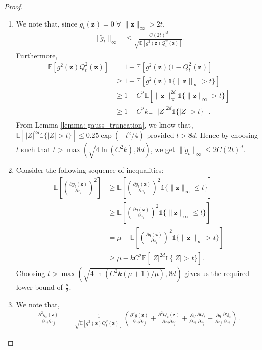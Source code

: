 \documentclass[final,12pt]{colt2018} %
\newcommand{\E}{\mathbb{E}}
\renewcommand\v[1]{{\ensuremath{\boldsymbol{#1}}}}
\newcommand{\indicator}[1]{\mathds{1}\{#1\}}
\begin{document}
\begin{proof}
\begin{enumerate}
    \item We note that, since $\tilde{g}_t(\v z) = 0 \; \forall \; \| \v z\|_\infty > 2t$, 
    \begin{align*}
        \| \tilde{g}_t \|_\infty & \leq \frac{C(2t)^d}{\sqrt{\E[g^2(\v z) Q_t^2(\v z)]}}.
    \end{align*}
    Furthermore, 
    \begin{align*}
        \E[g^2(\v z) Q_t^2(\v z)]  &= 1 - \E[g^2(\v z) (1-Q_t^2(\v z)] \\ 
        & \geq 1 - \E[g^2(\v z) \indicator{\| \v z\|_\infty > t}] \\
        & \geq 1 - C^2 \E[ \| \v z\|_\infty^{2d} \indicator{\| \v z\|_\infty > t}] \\
        & \geq 1 - C^2 k \E[|Z|^{2d} \indicator{|Z|> t}].
    \end{align*}
    From Lemma \ref{lemma: gauss_truncation}, we know that, $\E[|Z|^{2d} \indicator{|Z|>t}] \leq 0.25\exp(-t^2/4)$ provided $t>8d$. Hence by choosing $t$ such that $t> \max(\sqrt{4\ln(C^2 k)},8d)$, we get $\|\tilde{g}_t\|_\infty \leq 2C (2t)^d$. 
    \item Consider the following sequence of inequalities: 
    \begin{align*}
        \E\left[\left( \frac{\partial \tilde{g}_t(\v z)}{\partial z_i}\right)^2\right] & \geq \E\left[\left( \frac{\partial \tilde{g}_t(\v z)}{\partial z_i}\right)^2 \indicator{\| \v z\|_\infty \leq t}\right] \\
        & \geq \E\left[\left( \frac{\partial g(\v z)}{\partial z_i}\right)^2 \indicator{\| \v z\|_\infty \leq t}\right] \\
        & = \mu - \E\left[\left( \frac{\partial g(\v z)}{\partial z_i}\right)^2 \indicator{\| \v z\|_\infty > t}\right] \\
        & \geq \mu - k C^2 \E[|Z|^{2d} \indicator{|Z|>t}] . %
    \end{align*}
    Choosing $t> \max(\sqrt{4\ln(C^2 k(\mu+1)/\mu)},8d)$ gives us the required lower bound of $\frac{\mu}{2}$.
    \item We note that, 
    \begin{align*}
        \frac{\partial^2 \tilde{g}_t(\v z)}{\partial z_i \partial z_j} & = \frac{1}{\sqrt{\E[g^2(\v z) Q_t^2(\v z)]}}\left(  \frac{\partial^2 g(\v z)}{\partial z_i \partial z_j} +  \frac{\partial^2 Q_t(\v z)}{\partial z_i \partial z_j} + \frac{\partial g}{\partial z_i}\frac{\partial Q_t}{\partial z_j} + \frac{\partial g}{\partial z_j} \frac{\partial Q_t}{\partial z_i} \right).

\end{align*}
\end{enumerate}
\end{proof}
\end{document}

